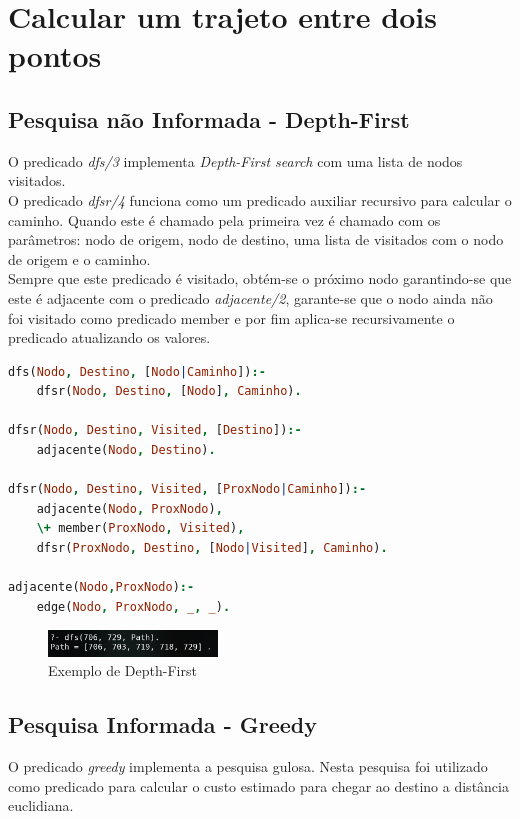 \documentclass[a4paper]{report}
\begin{document}
\section{Calcular um trajeto entre dois pontos}
\subsection{Pesquisa não Informada - Depth-First}
O predicado \textit{dfs/3} implementa \textit{Depth-First search} com uma lista de
nodos visitados.\\
O predicado \textit{dfsr/4} funciona como um predicado auxiliar recursivo para
calcular o caminho. Quando este é chamado pela primeira vez é chamado com os
parâmetros: nodo de origem, nodo de destino, uma lista de visitados com o nodo
de origem e o caminho.\\
Sempre que este predicado é visitado, obtém-se o próximo nodo garantindo-se que
este é adjacente com o predicado \textit{adjacente/2}, garante-se que o nodo ainda não foi
visitado como predicado member e por fim aplica-se recursivamente o predicado
atualizando os valores.
\begin{lstlisting}[language=Prolog]
dfs(Nodo, Destino, [Nodo|Caminho]):-
    dfsr(Nodo, Destino, [Nodo], Caminho).

dfsr(Nodo, Destino, Visited, [Destino]):-
    adjacente(Nodo, Destino).

dfsr(Nodo, Destino, Visited, [ProxNodo|Caminho]):-
    adjacente(Nodo, ProxNodo),
    \+ member(ProxNodo, Visited),
    dfsr(ProxNodo, Destino, [Nodo|Visited], Caminho).

adjacente(Nodo,ProxNodo):-
    edge(Nodo, ProxNodo, _, _).
\end{lstlisting}

\begin{figure}[H]
    \centering 
    \includegraphics[width=0.4\textwidth]{images/dfs.png}
    \caption{Exemplo de Depth-First}
\end{figure}

\subsection{Pesquisa Informada - Greedy}
O predicado \textit{greedy} implementa a pesquisa gulosa. Nesta pesquisa foi
utilizado como predicado para calcular o custo estimado para chegar ao destino a
distância euclidiana.\\
\end{document}
